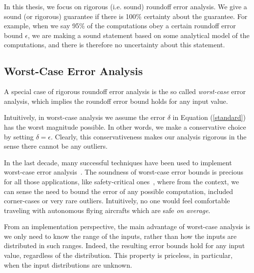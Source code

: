 In this thesis, we focus on rigorous (i.e. sound) roundoff error analysis.
%
We give a sound (or rigorous) guarantee if there is 100\% certainty about the guarantee.
%
%
For example, when we say 95\% of the computations obey a certain roundoff error bound $\epsilon$, we are making a sound statement based on some analytical model of the computations, and there is therefore no uncertainty about this statement.
%
%
\subsection{Worst-Case Error Analysis}
\label{sec:worst}
%
A special case of rigorous roundoff error analysis is the so called \emph{worst-case} error analysis, which implies the roundoff error bound holds for any input value.
%

Intuitively, in worst-case analysis we assume the error $\delta$ in Equation (\ref{standard}) has the worst magnitude possible. In other words, we make a conservative choice by setting $\delta=\epsilon$.
%
Clearly, this conservativeness makes our analysis rigorous in the sense there cannot be any outliers.
%

In the last decade, many successful techniques have been used to implement worst-case error analysis~\cite{darulova2018daisy,2015_fm_sjrg,solovyev2018rigorous,rosa,fptuner,smartfloat,satire,gappa,fluctuat}.
%
%
The soundness of worst-case error bounds is precious for all those applications, like safety-critical ones~\cite{guardstable, cpralg}, where from the context, we can sense the need to bound the error of any possible computation, included corner-cases or very rare outliers.
%
Intuitively, no one would feel comfortable traveling with autonomous flying aircrafts which are safe \emph{on average}.

%
From an implementation perspective, the main advantage of worst-case analysis is we only need to know the range of the inputs, rather than how the inputs are distributed in such ranges. 
%
Indeed, the resulting error bounds hold for any input value, regardless of the distribution.
%
%
This property is priceless, in particular, when the input distributions are unknown.
%

